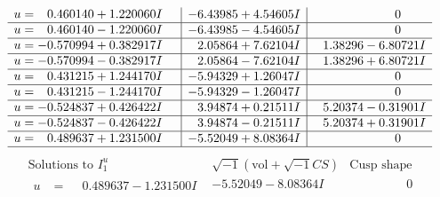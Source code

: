 \documentclass[1p]{elsarticle_modified}
\theoremstyle{definition}
\newcommand{\I}{\sqrt{-1}}
\begin{document}
$$\begin{array}{c|c|c}
\begin{aligned}
u &= \phantom{-}0.460140 + 1.220060 I\end{aligned}
 & -6.43985 + 4.54605 I & \phantom{-0.000000 } 0 \\ \hline\begin{aligned}
u &= \phantom{-}0.460140 - 1.220060 I\end{aligned}
 & -6.43985 - 4.54605 I & \phantom{-0.000000 } 0 \\ \hline\begin{aligned}
u &= -0.570994 + 0.382917 I\end{aligned}
 & \phantom{-}2.05864 + 7.62104 I & \phantom{-}1.38296 - 6.80721 I \\ \hline\begin{aligned}
u &= -0.570994 - 0.382917 I\end{aligned}
 & \phantom{-}2.05864 - 7.62104 I & \phantom{-}1.38296 + 6.80721 I \\ \hline\begin{aligned}
u &= \phantom{-}0.431215 + 1.244170 I\end{aligned}
 & -5.94329 + 1.26047 I & \phantom{-0.000000 } 0 \\ \hline\begin{aligned}
u &= \phantom{-}0.431215 - 1.244170 I\end{aligned}
 & -5.94329 - 1.26047 I & \phantom{-0.000000 } 0 \\ \hline\begin{aligned}
u &= -0.524837 + 0.426422 I\end{aligned}
 & \phantom{-}3.94874 + 0.21511 I & \phantom{-}5.20374 - 0.31901 I \\ \hline\begin{aligned}
u &= -0.524837 - 0.426422 I\end{aligned}
 & \phantom{-}3.94874 - 0.21511 I & \phantom{-}5.20374 + 0.31901 I \\ \hline\begin{aligned}
u &= \phantom{-}0.489637 + 1.231500 I\end{aligned}
 & -5.52049 + 8.08364 I & \phantom{-0.000000 } 0\\
 \hline 
 \end{array}$$\newpage$$\begin{array}{c|c|c}  
\text{Solutions to }I^u_{1}& \I (\text{vol} + \sqrt{-1}CS) & \text{Cusp shape}\\
 \hline 
\begin{aligned}
u &= \phantom{-}0.489637 - 1.231500 I\end{aligned}
 & -5.52049 - 8.08364 I & \phantom{-0.000000 } 0 \\ \hline\begin{aligned}

\end{aligned}
\end{array}$$
\end{document}
